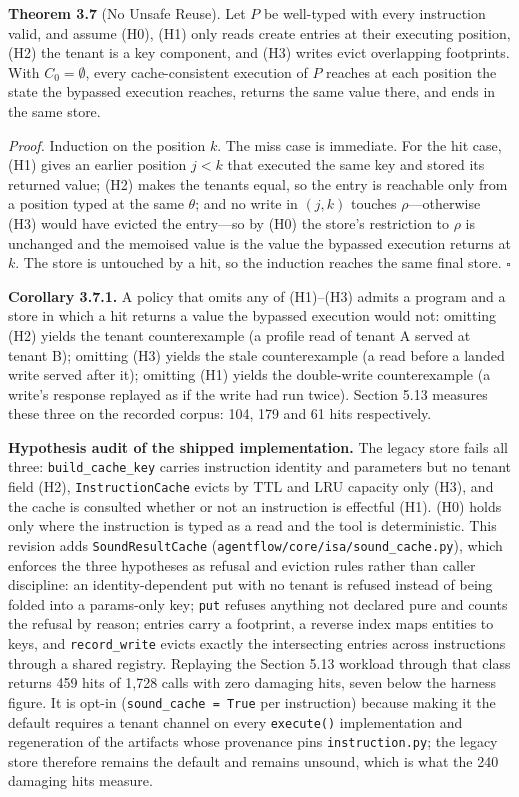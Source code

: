 \documentclass[
  11pt,
]{article}
\begin{document}
\textbf{Theorem 3.7} (No Unsafe Reuse). Let \(P\) be well-typed with
every instruction valid, and assume (H0), (H1) only reads create entries
at their executing position, (H2) the tenant is a key component, and
(H3) writes evict overlapping footprints. With \(C_0=\emptyset\), every
cache-consistent execution of \(P\) reaches at each position the state
the bypassed execution reaches, returns the same value there, and ends
in the same store.

\emph{Proof.} Induction on the position \(k\). The miss case is
immediate. For the hit case, (H1) gives an earlier position \(j<k\) that
executed the same key and stored its returned value; (H2) makes the
tenants equal, so the entry is reachable only from a position typed at
the same \(\theta\); and no write in \((j,k)\) touches
\(\rho\)---otherwise (H3) would have evicted the entry---so by (H0) the
store's restriction to \(\rho\) is unchanged and the memoised value is
the value the bypassed execution returns at \(k\). The store is
untouched by a hit, so the induction reaches the same final store.
\(\square\)

\textbf{Corollary 3.7.1.} A policy that omits any of (H1)--(H3) admits a
program and a store in which a hit returns a value the bypassed
execution would not: omitting (H2) yields the tenant counterexample (a
profile read of tenant A served at tenant B); omitting (H3) yields the
stale counterexample (a read before a landed write served after it);
omitting (H1) yields the double-write counterexample (a write's response
replayed as if the write had run twice). Section 5.13 measures these
three on the recorded corpus: 104, 179 and 61 hits respectively.

\textbf{Hypothesis audit of the shipped implementation.} The legacy
store fails all three: \texttt{build\_cache\_key} carries instruction
identity and parameters but no tenant field (H2),
\texttt{InstructionCache} evicts by TTL and LRU capacity only (H3), and
the cache is consulted whether or not an instruction is effectful (H1).
(H0) holds only where the instruction is typed as a read and the tool is
deterministic. This revision adds \texttt{SoundResultCache}
(\texttt{agentflow/core/isa/sound\_cache.py}), which enforces the three
hypotheses as refusal and eviction rules rather than caller discipline:
an identity-dependent put with no tenant is refused instead of being
folded into a params-only key; \texttt{put} refuses anything not
declared pure and counts the refusal by reason; entries carry a
footprint, a reverse index maps entities to keys, and
\texttt{record\_write} evicts exactly the intersecting entries across
instructions through a shared registry. Replaying the Section 5.13
workload through that class returns 459 hits of 1,728 calls with zero
damaging hits, seven below the harness figure. It is opt-in
(\texttt{sound\_cache\ =\ True} per instruction) because making it the
default requires a tenant channel on every \texttt{execute()}
implementation and regeneration of the artifacts whose provenance pins
\texttt{instruction.py}; the legacy store therefore remains the default
and remains unsound, which is what the 240 damaging hits measure.
\end{document}
